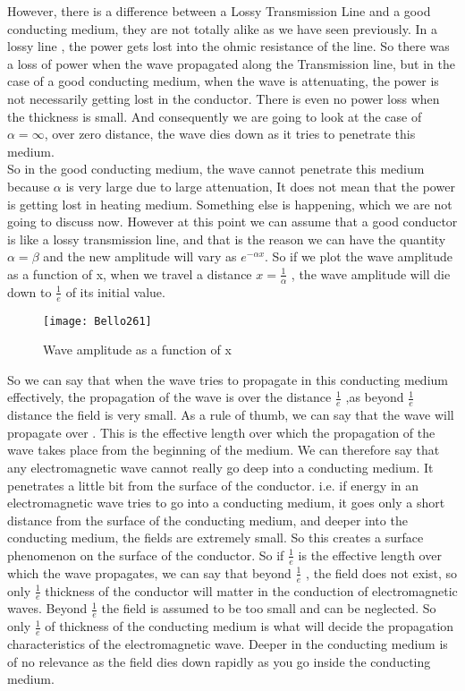 		However, there is a difference between a Lossy Transmission Line and a good conducting medium, they are not totally alike as we have seen previously.
		In a lossy line , the power gets lost into the ohmic resistance of the line. So there was a loss of power when the wave propagated along the Transmission line, but in the case of a good conducting medium, when the wave is attenuating, the power is not necessarily getting lost in the conductor. There is even no power loss when the thickness is small. And consequently we are going to look at the case of $\alpha=\infty$, over zero distance, the wave dies down as it tries to penetrate this medium.\\		
		So in the good conducting medium, the wave cannot penetrate this medium because $\alpha$ is very large due to large attenuation, It does not mean that the power is getting lost in heating medium. Something else is happening, which we are not going to discuss now. However at this point we can assume that a good conductor is like a lossy transmission line, and that is the reason we can have the quantity $\alpha=\beta$ and the new amplitude will vary as $e^{-\alpha x}$. So if we plot the wave amplitude as a function of x, when we travel a distance $x=\frac{1}{\alpha}$ , the wave amplitude will die down to $\frac{1}{e}$ of its initial value.\\
			\begin{figure}
			\centering
			\texttt{[image: Bello261]}
			\caption{Wave amplitude as a function of x}
			\label{fig:bello261}
		\end{figure}
		So we can say that when the wave tries to propagate in this conducting medium effectively, the propagation of the wave is over the distance $\frac{1}{e}$  ,as beyond $\frac{1}{e}$ distance the field is very small. As a rule of thumb, we can say that the wave will propagate over   . This is the effective length over which the propagation of the wave takes place from the beginning of the medium. We can therefore say that any electromagnetic wave cannot really go deep into a conducting medium. It penetrates a little bit from the surface of the conductor. i.e. if energy in an electromagnetic wave tries to go into a conducting medium, it goes only a short distance from the surface of the conducting medium, and deeper into the conducting medium, the fields are extremely small. So this creates a surface phenomenon on the surface of the conductor. So if $\frac{1}{e}$  is the effective length over which the wave propagates, we can say that beyond $\frac{1}{e}$  , the field does not exist, so only $\frac{1}{e}$ thickness of the conductor will matter in the conduction of electromagnetic waves. Beyond $\frac{1}{e}$  the field is assumed to be too small and can be neglected. So only $\frac{1}{e}$ of  thickness 
		of the conducting medium is what will decide the propagation characteristics of the electromagnetic wave. Deeper in the conducting medium is of no relevance as the field dies down rapidly as you go inside the conducting medium.\\
		

